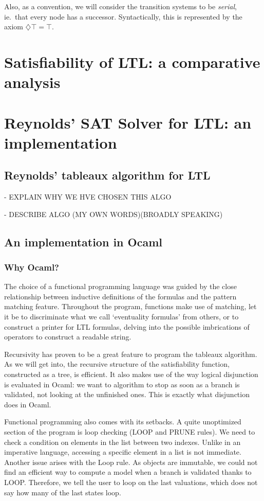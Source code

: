 \documentclass[11pt]{article}
\newcommand{\dia}{{\diamondsuit}}
\begin{document}
Also, as a convention, we will consider the transition systems to be \emph{serial}, ie.~that every node has a successor. Syntactically, this is represented by the axiom $\dia\top = \top$.

\section{Satisfiability of LTL: a comparative analysis}

\section{Reynolds' SAT Solver for LTL: an implementation}
\subsection{Reynolds' tableaux algorithm for LTL}
- EXPLAIN WHY WE HVE CHOSEN THIS ALGO

- DESCRIBE ALGO (MY OWN WORDS)(BROADLY SPEAKING)

\subsection{An implementation in Ocaml}
\subsubsection*{Why Ocaml?}
The choice of a functional programming language was guided by the close relationship
between inductive definitions of the formulas and the pattern matching feature.
Throughout the program, functions make use of matching, let it be to discriminate
what we call `eventuality formulas' from others, or to construct a printer
for LTL formulas, delving into the possible imbrications of operators to construct
a readable string.

Recursivity has proven to be a great feature to program the tableaux algorithm. 
As we will get into, the recursive structure of the satisfiability function,
constructed as a tree, is efficient. It also makes use of the way logical disjunction
is evaluated in Ocaml: we want to algorithm to stop as soon as a branch is validated,
not looking at the unfinished ones. This is exactly what disjunction does in Ocaml.

Functional programming also comes with its setbacks. A quite unoptimized section of 
the program is loop checking (LOOP and PRUNE rules). We need to check a condition on 
elements in the list between two indexes. Unlike in an imperative language, accessing
a specific element in a list is not immediate. Another issue arises with the Loop 
rule. As objects 
are immutable, we could not find an efficient way to compute a model when a branch is
validated thanks to LOOP. Therefore, we tell the user to loop on the last valuations,
which does not say how many of the last states loop.  
    
\end{document}
